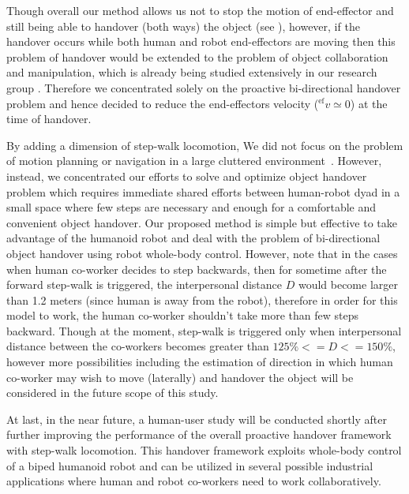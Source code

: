 Though overall our method allows us not to stop the motion of end-effector and still being able to handover (both ways) the object (see ), however, if the handover occurs while both human and robot end-effectors are moving then this problem of handover would be extended to the problem of object collaboration and manipulation, which is already being studied extensively in our research group \cite{bussy2012proactive, agravante2016walking, agravante2013human, bussy2012human, agravante2014collaborative, Agravante2019}. Therefore we concentrated solely on the proactive bi-directional handover problem and hence decided to reduce the end-effectors velocity (${}^\text{ef}v\simeq0$) at the time of handover. 

By adding a dimension of step-walk locomotion, We did not focus on the problem of motion planning or navigation in a large cluttered environment~\cite{mainprice2012sharing, vahrenkamp2009humanoid, kim2004advanced}. However, instead, we concentrated our efforts to solve and optimize object handover problem which requires immediate shared efforts between human-robot dyad in a small space where few steps are necessary and enough for a comfortable and convenient object handover. Our proposed method is simple but effective to take advantage of the humanoid robot and deal with the problem of bi-directional object handover using robot whole-body control. However, note that in the cases when human co-worker decides to step backwards, then for sometime after the forward step-walk is triggered, the interpersonal distance $ D $ would become larger than 1.2 meters (since human is away from the robot), therefore in order for this model to work, the human co-worker shouldn't take more than few steps backward. Though at the moment, step-walk is triggered only when interpersonal distance between the co-workers becomes greater than $ 125\% <= D <= 150\% $, however more possibilities including the estimation of direction in which human co-worker may wish to move (laterally) and handover the object will be considered in the future scope of this study. 

At last, in the near future, a human-user study will be conducted shortly after further improving the performance of the overall proactive handover framework with step-walk locomotion. This handover framework exploits whole-body control of a biped humanoid robot and can be utilized in several possible industrial applications where human and robot co-workers need to work collaboratively.


\clearpage %
\pagestyle{fancy}









